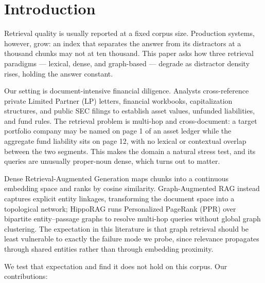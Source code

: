 \documentclass[runningheads]{llncs}
\begin{document}
\section{Introduction}

Retrieval quality is usually reported at a fixed corpus size. Production systems, however, grow: an index that separates the answer from its distractors at a thousand chunks may not at ten thousand. This paper asks how three retrieval paradigms --- lexical, dense, and graph-based --- degrade as distractor density rises, holding the answer constant.

Our setting is document-intensive financial diligence. Analysts cross-reference private Limited Partner (LP) letters, financial workbooks, capitalization structures, and public SEC filings to establish asset values, unfunded liabilities, and fund rules. The retrieval problem is multi-hop and cross-document: a target portfolio company may be named on page 1 of an asset ledger while the aggregate fund liability sits on page 12, with no lexical or contextual overlap between the two segments. This makes the domain a natural stress test, and its queries are unusually proper-noun dense, which turns out to matter.

Dense Retrieval-Augmented Generation \cite{lewis2020rag,karpukhin2020dpr} maps chunks into a continuous embedding space and ranks by cosine similarity. Graph-Augmented RAG \cite{edge2024graphrag,peng2024graphrag} instead captures explicit entity linkages, transforming the document space into a topological network; HippoRAG \cite{gutierrez2024hipporag,gutierrez2025hipporag2} runs Personalized PageRank (PPR) \cite{page1999pagerank} over bipartite entity--passage graphs to resolve multi-hop queries without global graph clustering. The expectation in this literature is that graph retrieval should be least vulnerable to exactly the failure mode we probe, since relevance propagates through shared entities rather than through embedding proximity.

We test that expectation and find it does not hold on this corpus. Our contributions:
\end{document}
